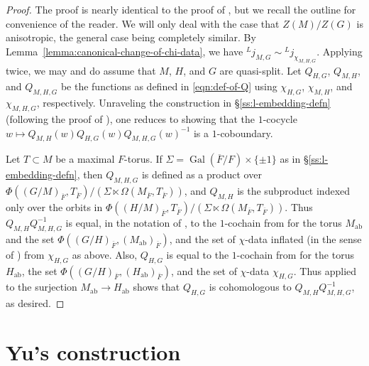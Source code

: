 \documentclass[reqno]{amsart}
\numberwithin{equation}{subsection}
\newcommand{\Gal}{\operatorname{Gal}}
\newcommand{\ol}[1]{\overline{#1}}
\newcommand{\ld}{{}^L}
\DeclareMathOperator{\ab}{ab}
\theoremstyle{remark}
\numberwithin{equation}{subsection}
\numberwithin{figure}{subsection}
\begin{document}
\begin{proof}
The proof is nearly identical to the proof of \cite[Proposition 6.9]{Kal21a}, but we recall the outline for convenience of the reader. We will only deal with the case that $Z(M)/Z(G)$ is anisotropic, the general case being completely similar. By Lemma~\ref{lemma:canonical-change-of-chi-data}, we have $\ld j_{M,G} \sim \ld j_{\chi_{M,H,G}}$. Applying \cite[Lemma 6.4]{Kal21a} twice, we may and do assume that $M$, $H$, and $G$ are quasi-split. Let $Q_{H,G}$, $Q_{M,H}$, and $Q_{M,H,G}$ be the functions as defined in \eqref{eqn:def-of-Q} using $\chi_{H,G}$, $\chi_{M,H}$, and $\chi_{M,H,G}$, respectively. Unraveling the construction in \S\ref{ss:l-embedding-defn} (following the proof of \cite[Proposition 6.9]{Kal21a}), one reduces to showing that the $1$-cocycle $w \mapsto Q_{M,H}(w)Q_{H,G}(w)Q_{M,H,G}(w)^{-1}$ is a $1$-coboundary.

Let $T \subset M$ be a maximal $F$-torus. If $\Sigma = \Gal(\ol F/F) \times \{\pm 1\}$ as in \S\ref{ss:l-embedding-defn}, then $Q_{M,H,G}$ is defined as a product over $\Phi((G/M)_{\ol F}, T_{\ol F})/(\Sigma \ltimes \Omega(M_{\ol F}, T_{\ol F}))$, and $Q_{M,H}$ is the subproduct indexed only over the orbits in $\Phi((H/M)_{\ol F}, T_{\ol F})/(\Sigma\ltimes \Omega(M_{\ol F}, T_{\ol F}))$. Thus $Q_{M,H}Q_{M,H,G}^{-1}$ is equal, in the notation of \cite[\S6]{Kal21a}, to the $1$-cochain from \cite[Definition 3.17]{Kal21a} for the torus $M_{\ab}$ and the set $\Phi((G/H)_{\ol F}, (M_{\ab})_{\ol F})$, and the set of $\chi$-data inflated (in the sense of \cite[Definition 5.16]{Kal21a}) from $\chi_{H,G}$ as above. Also, $Q_{H,G}$ is equal to the $1$-cochain from \cite[Definition 3.17]{Kal21a} for the torus $H_{\ab}$, the set $\Phi((G/H)_{\ol F}, (H_{\ab})_{\ol F})$, and the set of $\chi$-data $\chi_{H,G}$. Thus \cite[Proposition 5.23(2)]{Kal21a} applied to the surjection $M_{\ab} \to H_{\ab}$ shows that $Q_{H,G}$ is cohomologous to $Q_{M,H}Q_{M,H,G}^{-1}$, as desired.
\end{proof}









\section{Yu's construction}\label{ss:yu-construction}
\end{document}
